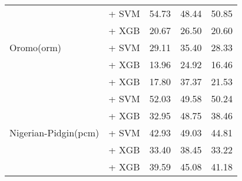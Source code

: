 \begin{longtable}{llccc}
    \midrule
    \multirow{5}{*}{Oromo(orm)}           & \citep{wang2024multilingual} + SVM                                     & 54.73                                & 48.44              & 50.85             \\
                                          & \citep{feng2022languageagnosticbertsentenceembedding} + XGB            & 20.67                                & 26.50              & 20.60             \\
                                          & \citep{feng2022languageagnosticbertsentenceembedding} + SVM            & 29.11                                & 35.40              & 28.33             \\
                                          & \citep{all-MiniLM-L12-v2} + XGB                                        & 13.96                                & 24.92              & 16.46             \\
                                          & \citep{sturua2024jinaembeddingsv3multilingualembeddingstask} + XGB     & 17.80                                & 37.37              & 21.53             \\

    \midrule
    \multirow{5}{*}{Nigerian-Pidgin(pcm)} & \citep{wang2024multilingual} + SVM                                     & 52.03                                & 49.58              & 50.24             \\
                                          & \citep{feng2022languageagnosticbertsentenceembedding} + XGB            & 32.95                                & 48.75              & 38.46             \\
                                          & \citep{feng2022languageagnosticbertsentenceembedding} + SVM            & 42.93                                & 49.03              & 44.81             \\
                                          & \citep{all-MiniLM-L12-v2} + XGB                                        & 33.40                                & 38.45              & 33.22             \\
                                          & \citep{sturua2024jinaembeddingsv3multilingualembeddingstask} + XGB     & 39.59                                & 45.08              & 41.18             \\


\end{longtable}
